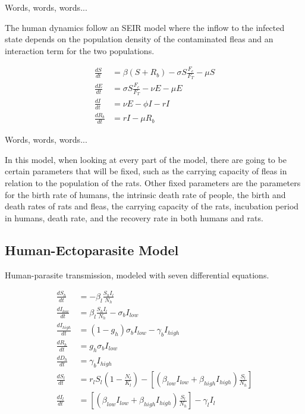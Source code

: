 \documentclass [letterpaper, 12pt] {article}
\begin{document}
Words, words, words...



The human dynamics follow an SEIR model where the inflow to the infected state depends on the
population density of the contaminated fleas and an interaction term for the two populations.

\begin{align}
	\frac{dS}{dt} &= \beta (S+R_b) - \sigma S \frac{F_c}{F_T} - \mu S \\
	\frac{dE}{dt} &= \sigma S \frac{F_c}{F_T} - \nu E - \mu E \\
	\frac{dI}{dt} &= \nu E - \phi I - rI \\
	\frac{dR_b}{dt} &= rI - \mu R_b
\end{align}

Words, words, words...



In this model, when looking at every part of the model, there are going to be certain parameters
that will be fixed, such as the carrying capacity of fleas in relation to the population of the rats.
Other fixed parameters are the parameters for the birth rate of humans, the intrinsic death rate of
people, the birth and death rates of rats and fleas, the carrying capacity of the rats, incubation period
in humans, death rate, and the recovery rate in both humans and rats.

\subsection {Human-Ectoparasite Model}
Human-parasite transmission, modeled with seven differential equations.

\begin{equation}
	\begin{align*}
		\frac{dS_h}{dt} &= -\beta_l \frac{S_h I_l}{N_h} \\
		\frac{dI_{low}}{dt} &= \beta_l \frac{S_h I_l}{N_h} - \sigma_b I_{low} \\
		\frac{dI_{high}}{dt} &= (1-g_h) \sigma_b I_{low} - \gamma_b I_{high} \\
		\frac{dR_h}{dt} &= g_h \sigma_b I_{low} \\
		\frac{dD_h}{dt} &= \gamma_b I_{high} \\
		\frac{dS_l}{dt} &= r_l S_l \left( 1 - \frac{N_l}{K_l} \right) - \left[ \left( \beta_{low} I_{low} + \beta_{high} I_{high} \right) \frac{S_l}{N_h} \right] \\
		\frac{dI_l}{dt} &= \left[ \left( \beta_{low} I_{low} + \beta_{high} I_{high} \right) \frac{S_l}{N_h} \right] - \gamma_l I_l
	\end{align*}
\end{equation}
\end{document}
